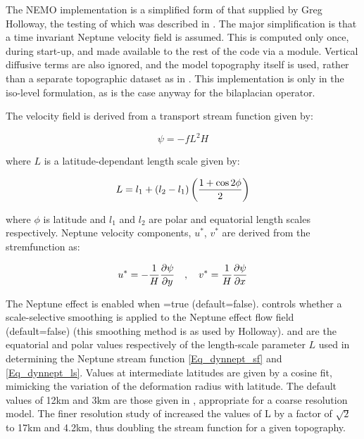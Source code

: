 \documentclass[NEMO_book]{subfiles}
\begin{document}
The NEMO implementation is a simplified form of that supplied by
Greg Holloway, the testing of which was described in \citep{HollowayJGR09}.
The major simplification is that a time invariant Neptune velocity
field is assumed.  This is computed only once, during start-up, and
made available to the rest of the code via a module.  Vertical
diffusive terms are also ignored, and the model topography itself
is used, rather than a separate topographic dataset as in
\citep{HollowayOM08}.  This implementation is only in the iso-level
formulation, as is the case anyway for the bilaplacian operator.

The velocity field is derived from a transport stream function given by:

\begin{equation} \label{Eq_dynnept_sf}
\psi = -fL^2H
\end{equation}

where $L$ is a latitude-dependant length scale given by:

\begin{equation} \label{Eq_dynnept_ls}
L = l_1 + (l_2 -l_1)\left ( {1 + \cos 2\phi \over 2 } \right )
\end{equation}

where $\phi$ is latitude and $l_1$ and $l_2$ are polar and equatorial length scales respectively.
Neptune velocity components, $u^*$, $v^*$ are derived from the stremfunction as:

\begin{equation} \label{Eq_dynnept_vel}
u^* = -{1\over H} {\partial \psi \over \partial y}\ \ \  ,\ \ \ v^* = {1\over H} {\partial \psi \over \partial x}
\end{equation}

\smallskip
\smallskip

The Neptune effect is enabled when =true (default=false).
 controls whether a scale-selective smoothing is applied
to the Neptune effect flow field (default=false) (this smoothing method is as
used by Holloway).   and  are the equatorial and
polar values respectively of the length-scale parameter $L$ used in determining
the Neptune stream function \eqref{Eq_dynnept_sf} and \eqref{Eq_dynnept_ls}.
Values at intermediate latitudes are given by a cosine fit, mimicking the
variation of the deformation radius with latitude.  The default values of 12km
and 3km are those given in \citep{HollowayJPO94}, appropriate for a coarse
resolution model. The finer resolution study of \citep{HollowayOM08} increased
the values of L by a factor of $\sqrt 2$ to 17km and 4.2km, thus doubling the
stream function for a given topography.
\end{document}
